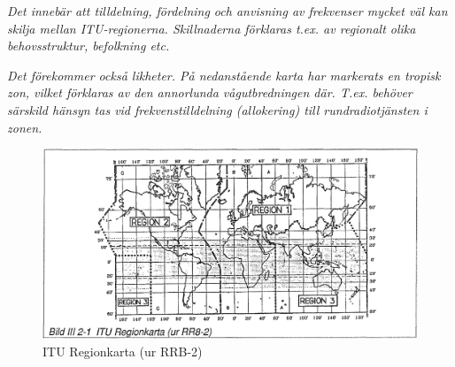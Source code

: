 \emph{ Det innebär att tilldelning, fördelning och anvisning av
  frekvenser mycket väl kan skilja mellan ITU-regionerna. Skillnaderna
  förklaras t.ex. av regionalt olika behovsstruktur, befolkning etc.}

\emph{Det förekommer också likheter. På nedanstående karta har
  markerats en tropisk zon, vilket förklaras av den annorlunda
  vågutbredningen där. T.ex. behöver särskild hänsyn tas vid
  frekvenstilldelning (allokering) till rundradiotjänsten i zonen.}

\begin{figure}
  \includegraphics[width=\textwidth]{images/bild_3_2-01}
  \caption{ITU Regionkarta (ur RRB-2)}
  \label{fig:bildIII2-1}
\end{figure}
